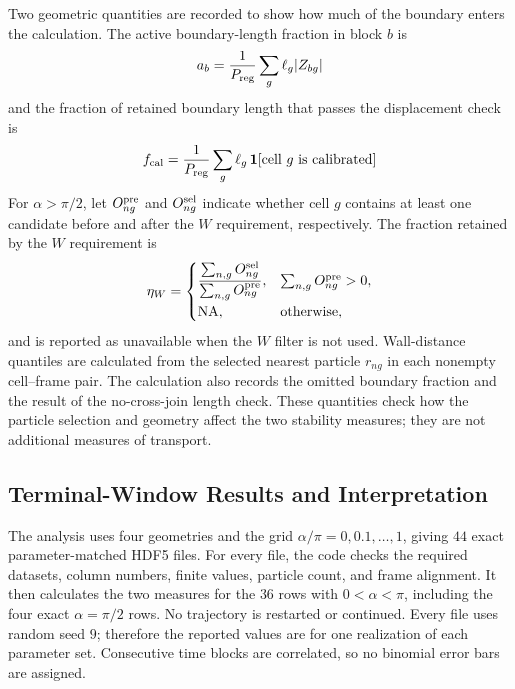 \documentclass[11pt]{article}
\numberwithin{equation}{section}
\begin{document}
Two geometric quantities are recorded to show how much of the boundary enters
the calculation.  The active boundary-length fraction in block $b$ is
\begin{equation}
  a_b=\frac{1}{P_{\rm reg}}\sum_g\ell_g|Z_{bg}|
  \label{eq:active_arclength_fraction}
\end{equation}
and the fraction of retained boundary length that passes the displacement
check is
\begin{equation}
  f_{\rm cal}=\frac{1}{P_{\rm reg}}
  \sum_g\ell_g\,\mathbf 1[\text{cell $g$ is calibrated}]
  \label{eq:calibrated_perimeter_fraction}
\end{equation}
For $\alpha>\pi/2$, let $O_{ng}^{\rm pre}$ and
$O_{ng}^{\rm sel}$ indicate whether cell $g$ contains at least one candidate
before and after the $W$ requirement, respectively.  The fraction retained by
the $W$ requirement is
\begin{equation}
 \eta_W=
 \begin{cases}
 \displaystyle
 \frac{\sum_{n,g}O_{ng}^{\rm sel}}
      {\sum_{n,g}O_{ng}^{\rm pre}},
 &\sum_{n,g}O_{ng}^{\rm pre}>0,\\[0.8em]
 \mathrm{NA},&\text{otherwise},
 \end{cases}
 \label{eq:w_grid_retention}
\end{equation}
and is reported as unavailable when the $W$ filter is not used.  Wall-distance
quantiles are calculated from the selected nearest particle $r_{ng}$ in each
nonempty cell--frame pair.  The calculation also records the omitted boundary
fraction and the result of the no-cross-join length check.  These quantities
check how the particle selection and geometry affect the two stability
measures; they are not additional measures of transport.

\subsection{Terminal-Window Results and Interpretation}

The analysis uses four geometries and the grid
$\alpha/\pi=0,0.1,\ldots,1$, giving $44$ exact parameter-matched HDF5 files.
For every file, the code checks the required datasets, column numbers, finite
values, particle count, and frame alignment.  It then calculates the two
measures for the $36$ rows with $0<\alpha<\pi$, including the four exact
$\alpha=\pi/2$ rows.  No trajectory is restarted or continued.  Every file
uses random seed $9$; therefore the reported values are for one realization of
each parameter set.  Consecutive time blocks are correlated, so no binomial
error bars are assigned.
\end{document}
